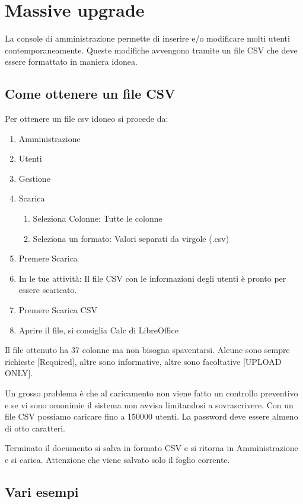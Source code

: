 \chapter{Massive upgrade}
La console di amministrazione permette di inserire e/o modificare molti utenti contemporaneamente. Queste modifiche avvengono tramite un file CSV\cite{Google2023h} che deve essere formattato in maniera idonea.
\section{Come ottenere un file CSV}
Per ottenere un file csv idoneo si procede da:
\begin{enumerate}
	\item Amministrazione
	\item Utenti
	\item Gestione
	\item Scarica
	\begin{enumerate}
		\item Seleziona Colonne: Tutte le colonne
		\item Seleziona un formato: Valori separati da virgole (.csv)
	\end{enumerate}
	\item Premere Scarica
	\item In le tue attività: Il file CSV con le informazioni degli utenti è pronto per essere scaricato.
	\item Premere Scarica CSV
	\item Aprire il file, si consiglia Calc di LibreOffice
\end{enumerate}

Il file ottenuto ha 37 colonne ma non bisogna spaventarsi. Alcune  sono sempre richieste [Required], altre sono informative, altre sono facoltative [UPLOAD ONLY]. 

Un grosso problema è che al caricamento non viene fatto un controllo preventivo e se vi sono omonimie il sistema non avvisa limitandosi a sovrascrivere. Con un file CSV possiamo caricare fino a 150000 utenti. La password deve essere almeno di otto caratteri.

Terminato il documento si salva in formato CSV e si ritorna in Amministrazione e si carica. Attenzione che viene salvato solo il foglio corrente.
\section{Vari esempi}
